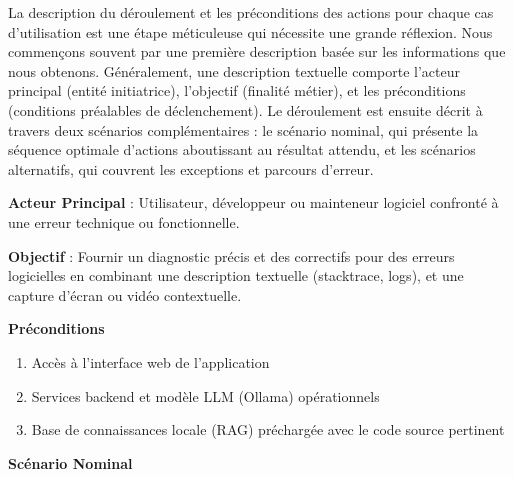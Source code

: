 \documentclass[12pt,a4paper]{report}
\begin{document}
	La description du déroulement et les préconditions des actions pour chaque cas d'utilisation est une étape méticuleuse qui nécessite une grande réflexion. Nous commençons souvent par une première description basée sur les informations que nous obtenons.
	Généralement, une description textuelle comporte l'acteur principal (entité initiatrice), l'objectif (finalité métier), et les préconditions (conditions préalables de déclenchement). Le déroulement est ensuite décrit à travers deux scénarios complémentaires : le scénario nominal, qui présente la séquence optimale d'actions aboutissant au résultat attendu, et les scénarios alternatifs, qui couvrent les exceptions et parcours d'erreur.
	
	\textbf{Acteur Principal} : Utilisateur, développeur ou mainteneur logiciel confronté à une erreur technique ou fonctionnelle.	
	
	\textbf{Objectif} : Fournir un diagnostic précis et des correctifs pour des erreurs logicielles en combinant une description textuelle (stacktrace, logs), et une capture d'écran ou vidéo contextuelle.
	
	\textbf{Préconditions}
	
	\begin{enumerate}
		\item Accès à l'interface web de l'application
		\item Services backend et modèle LLM (Ollama) opérationnels
		\item Base de connaissances locale (RAG) préchargée avec le code source pertinent
	\end{enumerate}
	
	\textbf{Scénario Nominal}
	
\end{document}
